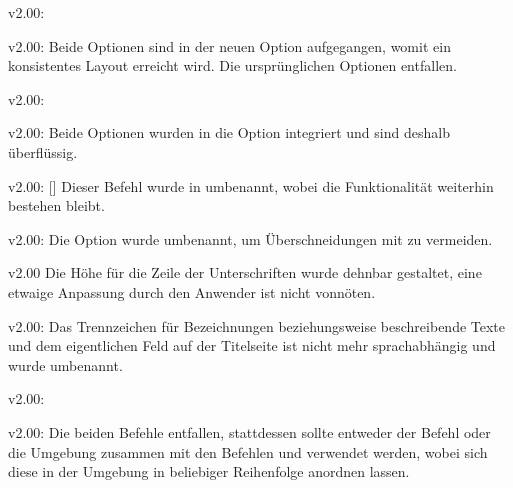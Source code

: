 \begin{Obsolete}{v2.00:}{%
}
\begin{Obsolete}{v2.00:}{%
}
\printobsoletelist%
%
Beide Optionen sind in der neuen Option  
aufgegangen, womit ein konsistentes Layout erreicht wird. Die ursprünglichen 
Optionen entfallen. 
\end{Obsolete}
\end{Obsolete}

\begin{Obsolete}{v2.00:}{}
\begin{Obsolete}{v2.00:}{}
\printobsoletelist%
%
Beide Optionen wurden in die Option  integriert und sind 
deshalb überflüssig.
\end{Obsolete}
\end{Obsolete}

\begin{Obsolete}{v2.00:}{%
  []%
}
\printobsoletelist%
%
Dieser Befehl wurde in  umbenannt, wobei die Funktionalität 
weiterhin bestehen bleibt.
\end{Obsolete}

\begin{Obsolete}{v2.00:}{}
\printobsoletelist%
%
Die Option wurde umbenannt, um Überschneidungen mit  zu 
vermeiden.
\end{Obsolete}

\begin{Obsolete}{v2.00}{}
\printobsoletelist%
%
Die Höhe für die Zeile der Unterschriften wurde dehnbar gestaltet, eine etwaige 
Anpassung durch den Anwender ist nicht vonnöten.
\end{Obsolete}

\begin{Obsolete}{v2.00:}{}%
\printobsoletelist%
%
Das Trennzeichen für Bezeichnungen beziehungsweise beschreibende Texte und dem 
eigentlichen Feld auf der Titelseite ist nicht mehr sprachabhängig und wurde 
umbenannt.
\end{Obsolete}

\begin{Obsolete}{v2.00:}{}
\begin{Obsolete}{v2.00:}{}
\printobsoletelist%
%
Die beiden Befehle entfallen, stattdessen sollte entweder der Befehl 
 oder die Umgebung  zusammen mit 
den Befehlen  und  verwendet werden, 
wobei sich diese in der Umgebung in beliebiger Reihenfolge anordnen lassen.
\end{Obsolete}
\end{Obsolete}

